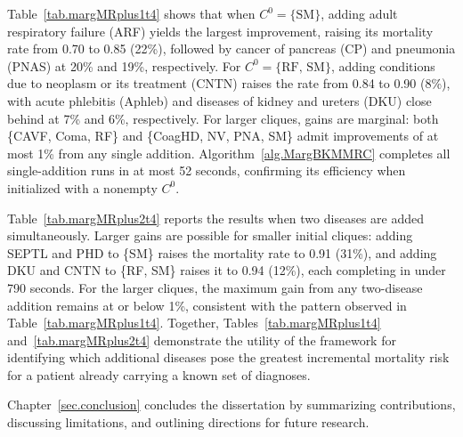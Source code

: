 \begin{table}[htbp]
\centering
{}
\caption{Top-3 Most Lethal Cliques Formed by the Addition of Two
Diseases}
\label{tab.margMRplus2t4}
\end{table}

Table~\ref{tab.margMRplus1t4} shows that when $C^0 = \{\text{SM}\}$,
adding adult respiratory failure (ARF) yields the largest improvement,
raising its mortality rate from 0.70 to 0.85 (22\%), followed by cancer of
pancreas (CP) and pneumonia (PNAS) at 20\% and 19\%, respectively.
For $C^0 = \{\text{RF, SM}\}$, adding conditions due to neoplasm or
its treatment (CNTN) raises the rate from 0.84 to 0.90 (8\%), with
acute phlebitis (Aphleb) and diseases of kidney and ureters (DKU)
close behind at 7\% and 6\%, respectively. For larger cliques, gains
are marginal: both \{CAVF, Coma, RF\} and \{CoagHD, NV, PNA, SM\}
admit improvements of at most 1\% from any single addition.
Algorithm~\ref{alg.MargBKMMRC} completes all single-addition runs in at
most 52 seconds, confirming its
efficiency when initialized with a nonempty $C^0$.

Table~\ref{tab.margMRplus2t4} reports the results when two diseases
are added simultaneously. Larger gains are possible for smaller
initial cliques: adding SEPTL and PHD to \{SM\} raises the mortality
rate to 0.91 (31\%), and adding DKU and CNTN to \{RF, SM\} raises it
to 0.94 (12\%), each completing in under 790 seconds. For the larger cliques, the maximum gain from any two-disease
addition remains at or below 1\%, consistent with the pattern
observed in Table~\ref{tab.margMRplus1t4}. Together,
Tables~\ref{tab.margMRplus1t4} and~\ref{tab.margMRplus2t4}
demonstrate the utility of the framework for identifying which
additional diseases pose the greatest incremental mortality risk for
a patient already carrying a known set of diagnoses.

Chapter~\ref{sec.conclusion} concludes the dissertation by summarizing contributions, discussing limitations, and outlining directions for future research.